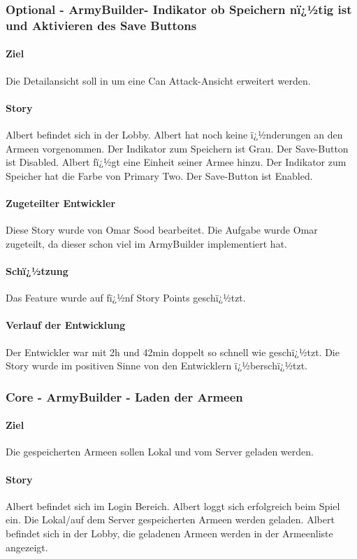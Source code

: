 \documentclass[12pt, titlepage]{scrartcl}
\begin{document}
			\subsubsection{Optional - ArmyBuilder- Indikator ob Speichern nï¿½tig ist und Aktivieren des Save Buttons}
			\paragraph{Ziel} Die Detailansicht soll in um eine \glqq Can Attack\grqq-Ansicht erweitert werden.
			\paragraph{Story} Albert befindet sich in der Lobby. Albert hat noch keine ï¿½nderungen an den Armeen vorgenommen. Der Indikator zum Speichern ist Grau. Der Save-Button ist Disabled. Albert fï¿½gt eine Einheit seiner Armee hinzu. Der Indikator zum Speicher hat die Farbe von Primary Two. Der Save-Button ist Enabled.
			\paragraph{Zugeteilter Entwickler} Diese Story wurde von Omar Sood bearbeitet. Die Aufgabe wurde Omar zugeteilt, da dieser schon viel im ArmyBuilder implementiert hat.
			\paragraph{Schï¿½tzung}
			Das Feature wurde auf fï¿½nf Story Points geschï¿½tzt.
			\paragraph{Verlauf der Entwicklung} 
			Der Entwickler war mit 2h und 42min doppelt so schnell wie geschï¿½tzt. Die Story wurde im positiven Sinne von den Entwicklern ï¿½berschï¿½tzt.
			\subsubsection{Core - ArmyBuilder - Laden der Armeen}
			\paragraph{Ziel} Die gespeicherten Armeen sollen Lokal und vom Server geladen werden.
			\paragraph{Story} Albert befindet sich im Login Bereich. Albert loggt sich erfolgreich beim Spiel ein. Die Lokal/auf dem Server gespeicherten Armeen werden geladen. Albert befindet sich in der Lobby, die geladenen Armeen werden in der Armeenliste angezeigt.
\end{document}
